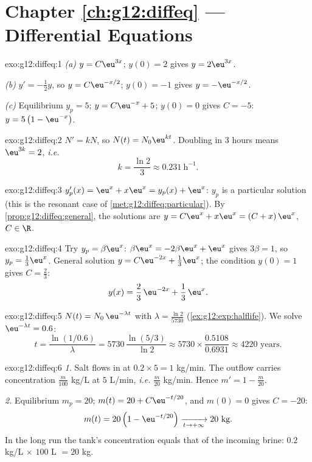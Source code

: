 \section*{Chapter \ref{ch:g12:diffeq} --- Differential Equations}

\begin{solution}{exo:g12:diffeq:1}
\emph{(a)} $y = C\eu^{3x}$; $y(0) = 2$ gives $y = 2\eu^{3x}$.

\emph{(b)} $y' = -\frac12 y$, so $y = C\eu^{-x/2}$; $y(0) = -1$ gives
$y = -\eu^{-x/2}$.

\emph{(c)} Equilibrium $y_p = 5$; $y = C\eu^{-x} + 5$; $y(0) = 0$ gives
$C = -5$: $y = 5\left(1 - \eu^{-x}\right)$.
\end{solution}

\begin{solution}{exo:g12:diffeq:2}
$N' = kN$, so $N(t) = N_0 \eu^{kt}$. Doubling in $3$ hours means
$\eu^{3k} = 2$, \emph{i.e.}
\[
k = \frac{\ln 2}{3} \approx 0.231\ \text{h}^{-1}.
\]
\end{solution}

\begin{solution}{exo:g12:diffeq:3}
$y_p'(x) = \eu^x + x\eu^x = y_p(x) + \eu^x$: $y_p$ is a particular solution
(this is the resonant case of \cref{met:g12:diffeq:particular}). By
\cref{prop:g12:diffeq:general}, the solutions are
$y = C\eu^{x} + x\eu^{x} = (C + x)\,\eu^x$, $C \in \R$.
\end{solution}

\begin{solution}{exo:g12:diffeq:4}
Try $y_p = \beta\eu^x$: $\beta\eu^x = -2\beta\eu^x + \eu^x$ gives
$3\beta = 1$, so $y_p = \frac13\eu^x$. General solution
$y = C\eu^{-2x} + \frac13\eu^{x}$; the condition $y(0) = 1$ gives
$C = \frac23$:
\[
y(x) = \frac{2}{3}\,\eu^{-2x} + \frac{1}{3}\,\eu^{x}.
\]
\end{solution}

\begin{solution}{exo:g12:diffeq:5}
$N(t) = N_0\,\eu^{-\lambda t}$ with $\lambda = \frac{\ln 2}{5730}$
(\cref{ex:g12:exp:halflife}). We solve $\eu^{-\lambda t} = 0.6$:
\[
t = \frac{\ln(1/0.6)}{\lambda} = 5730\,\frac{\ln(5/3)}{\ln 2}
\approx 5730 \times \frac{0.5108}{0.6931} \approx 4220 \text{ years}.
\]
\end{solution}

\begin{solution}{exo:g12:diffeq:6}
\emph{1.} Salt flows in at $0.2 \times 5 = 1$ kg/min. The outflow carries
concentration $\frac{m}{100}$ kg/L at $5$ L/min, \emph{i.e.} $\frac{m}{20}$
kg/min. Hence $m' = 1 - \frac{m}{20}$.

\emph{2.} Equilibrium $m_p = 20$; $m(t) = 20 + C\eu^{-t/20}$, and
$m(0) = 0$ gives $C = -20$:
\[
m(t) = 20\left(1 - \eu^{-t/20}\right) \xrightarrow[t\to+\infty]{} 20 \text{ kg}.
\]
In the long run the tank's concentration equals that of the incoming brine:
$0.2$ kg/L $\times$ $100$ L $= 20$ kg.
\end{solution}

